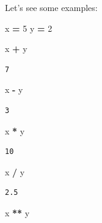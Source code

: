 \documentclass[
  letterpaper,
]{scrbook}
\newenvironment{Shaded}{\begin{snugshade}}{\end{snugshade}}
\newcommand{\DecValTok}[1]{\textcolor[rgb]{0.00,0.00,0.81}{#1}}
\newcommand{\NormalTok}[1]{#1}
\newcommand{\OperatorTok}[1]{\textcolor[rgb]{0.81,0.36,0.00}{\textbf{#1}}}
\begin{document}
Let's see some examples:

\begin{Shaded}
\begin{Highlighting}[]
\NormalTok{x }\OperatorTok{=} \DecValTok{5}
\NormalTok{y }\OperatorTok{=} \DecValTok{2}
\end{Highlighting}
\end{Shaded}

\begin{Shaded}
\begin{Highlighting}[]
\NormalTok{x }\OperatorTok{+}\NormalTok{ y}
\end{Highlighting}
\end{Shaded}

\begin{verbatim}
7
\end{verbatim}

\begin{Shaded}
\begin{Highlighting}[]
\NormalTok{x }\OperatorTok{-}\NormalTok{ y}
\end{Highlighting}
\end{Shaded}

\begin{verbatim}
3
\end{verbatim}

\begin{Shaded}
\begin{Highlighting}[]
\NormalTok{x }\OperatorTok{*}\NormalTok{ y}
\end{Highlighting}
\end{Shaded}

\begin{verbatim}
10
\end{verbatim}

\begin{Shaded}
\begin{Highlighting}[]
\NormalTok{x }\OperatorTok{/}\NormalTok{ y}
\end{Highlighting}
\end{Shaded}

\begin{verbatim}
2.5
\end{verbatim}

\begin{Shaded}
\begin{Highlighting}[]
\NormalTok{x }\OperatorTok{**}\NormalTok{ y}
\end{Highlighting}
\end{Shaded}
\end{document}
